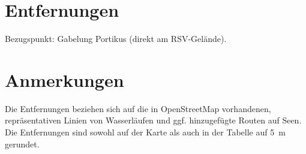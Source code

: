 \documentclass{article}
\begin{document}
    \section*{Entfernungen}
    Bezugspunkt: Gabelung Portikus (direkt am RSV-Gelände). \\        
    \section*{Anmerkungen}
    Die Entfernungen beziehen sich auf die in OpenStreetMap vorhandenen,
    repräsentativen Linien von Wasserläufen und ggf. hinzugefügte Routen auf
    Seen. Die Entfernungen sind sowohl auf der Karte als auch in der Tabelle auf 5~m gerundet.
\end{document}
